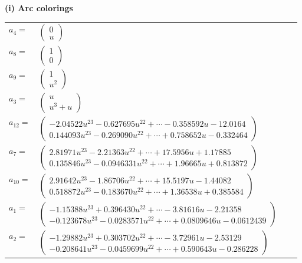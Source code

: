 \documentclass[1p]{elsarticle_modified}
\theoremstyle{definition}
\begin{document}
\flushleft \textbf{(i) Arc colorings}\\
\begin{tabular}{m{7pt} m{180pt} m{7pt} m{180pt} }
\flushright $a_{4}=$&$\begin{pmatrix}0\\u\end{pmatrix}$ \\
\flushright $a_{8}=$&$\begin{pmatrix}1\\0\end{pmatrix}$ \\
\flushright $a_{9}=$&$\begin{pmatrix}1\\u^2\end{pmatrix}$ \\
\flushright $a_{3}=$&$\begin{pmatrix}u\\u^3+u\end{pmatrix}$ \\
\flushright $a_{12}=$&$\begin{pmatrix}-2.04522 u^{23}-0.627695 u^{22}+\cdots-0.358592 u-12.0164\\0.144093 u^{23}-0.269090 u^{22}+\cdots+0.758652 u-0.332464\end{pmatrix}$ \\
\flushright $a_{7}=$&$\begin{pmatrix}2.81971 u^{23}-2.21363 u^{22}+\cdots+17.5956 u+1.17885\\0.135846 u^{23}-0.0946331 u^{22}+\cdots+1.96665 u+0.813872\end{pmatrix}$ \\
\flushright $a_{10}=$&$\begin{pmatrix}2.91642 u^{23}-1.86706 u^{22}+\cdots+15.5197 u-1.44082\\0.518872 u^{23}-0.183670 u^{22}+\cdots+1.36538 u+0.385584\end{pmatrix}$ \\
\flushright $a_{1}=$&$\begin{pmatrix}-1.15388 u^{23}+0.396430 u^{22}+\cdots-3.81616 u-2.21358\\-0.123678 u^{23}-0.0283571 u^{22}+\cdots+0.0809646 u-0.0612439\end{pmatrix}$ \\
\flushright $a_{2}=$&$\begin{pmatrix}-1.29882 u^{23}+0.303702 u^{22}+\cdots-3.72961 u-2.53129\\-0.208641 u^{23}-0.0459699 u^{22}+\cdots+0.590643 u-0.286228\end{pmatrix}$ \\

\end{tabular}
\end{document}
